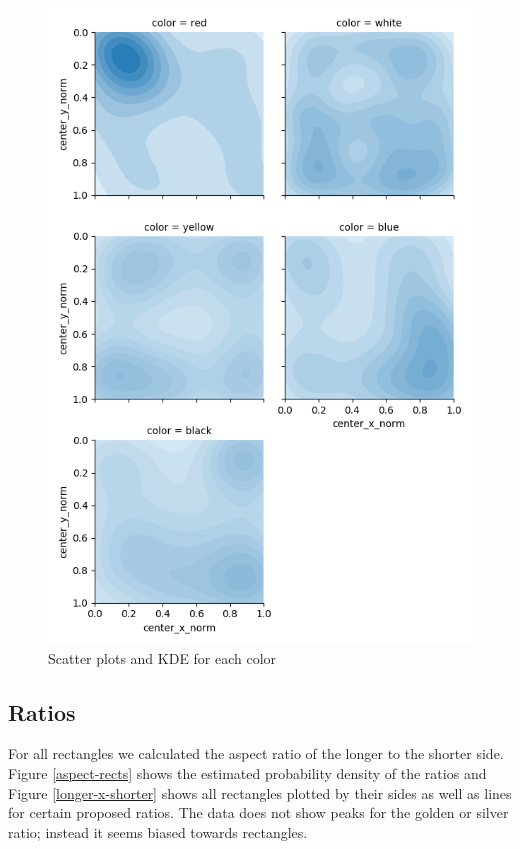 \begin{figure}
\includegraphics[width=\linewidth]{images/kernel-densities.png}
\caption{Scatter plots and KDE for each color}
\label{fig:kde}
\end{figure}

\subsection{Ratios} \label{ratios}

For all rectangles we calculated the aspect ratio of the longer to the shorter
side. Figure \ref{aspect-rects} shows the estimated probability density of the
ratios and Figure \ref{longer-x-shorter} shows all rectangles plotted by their
sides as well as lines for certain proposed ratios. The data does not show peaks
for the golden or silver ratio; instead it seems biased towards rectangles.

